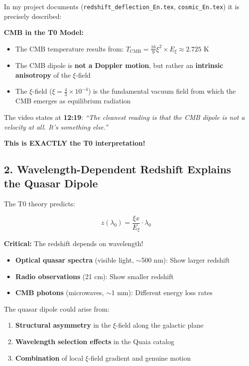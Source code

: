 \documentclass{article}
\begin{document}
	In my project documents (\texttt{redshift\_deflection\_En.tex}, \texttt{cosmic\_En.tex}) it is precisely described:
	
	\textbf{CMB in the T0 Model:}
	\begin{itemize}
		\item The CMB temperature results from: $T_{\text{CMB}} = \frac{16}{9} \xi^2 \times E_\xi \approx 2.725$ K
		\item The CMB dipole is \textbf{not a Doppler motion}, but rather an \textbf{intrinsic anisotropy} of the $\xi$-field
		\item The $\xi$-field ($\xi = \frac{4}{3} \times 10^{-4}$) is the fundamental vacuum field from which the CMB emerges as equilibrium radiation
	\end{itemize}
	
	The video states at \textbf{12:19}: \textit{``The cleanest reading is that the CMB dipole is not a velocity at all. It's something else.''}
	
	\textbf{This is EXACTLY the T0 interpretation!}
	
	\subsection{2. Wavelength-Dependent Redshift Explains the Quasar Dipole}
	
	The T0 theory predicts:
	
	$$z(\lambda_0) = \frac{\xi x}{E_\xi} \cdot \lambda_0$$
	
	\textbf{Critical:} The redshift depends on wavelength!
	
	\begin{itemize}
		\item \textbf{Optical quasar spectra} (visible light, $\sim$500 nm): Show larger redshift
		\item \textbf{Radio observations} (21 cm): Show smaller redshift
		\item \textbf{CMB photons} (microwaves, $\sim$1 mm): Different energy loss rates
	\end{itemize}
	
	The quasar dipole could arise from:
	\begin{enumerate}
		\item \textbf{Structural asymmetry} in the $\xi$-field along the galactic plane
		\item \textbf{Wavelength selection effects} in the Quaia catalog \cite{storey2024}
		\item \textbf{Combination} of local $\xi$-field gradient and genuine motion
	\end{enumerate}
	
\end{document}
